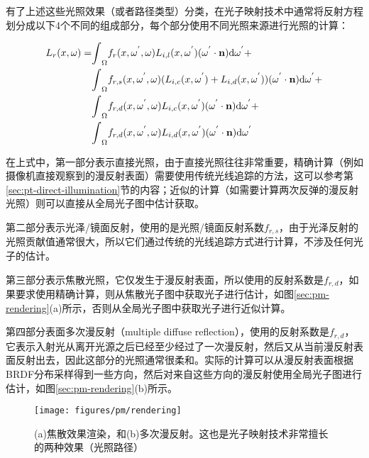 有了上述这些光照效果（或者路径类型）分类，在光子映射技术中通常将反射方程划分成以下4个不同的组成部分，每个部分使用不同光照来源进行光照的计算：

\begin{equation}\label{e:pm-four-componenets-equation}
\begin{aligned}
	L_r(x,{\omega})=&{\rm \int}_\Omega f_r(x,{\omega}^{'},{\omega}) L_{i,l}(x,{\omega}^{'}) ({\omega}^{'}\cdot\mathbf{n}) {\rm d}{\omega}^{'}+ \\
	&{\rm \int}_\Omega f_{r,s}(x,{\omega}^{'},{\omega}) (L_{i,c}(x,{\omega}^{'})+L_{i,d}(x,{\omega}^{'})) ({\omega}^{'}\cdot\mathbf{n}) {\rm d}{\omega}^{'}+ \\
	&{\rm \int}_\Omega f_{r,d}(x,{\omega}^{'},{\omega}) L_{i,c}(x,{\omega}^{'}) ({\omega}^{'}\cdot\mathbf{n}) {\rm d}{\omega}^{'}+ \\
	&{\rm \int}_\Omega f_{r,d}(x,{\omega}^{'},{\omega}) L_{i,d}(x,{\omega}^{'}) ({\omega}^{'}\cdot\mathbf{n}) {\rm d}{\omega}^{'}
\end{aligned}
\end{equation}

在上式中，第一部分表示直接光照，由于直接光照往往非常重要，精确计算（例如摄像机直接观察到的漫反射表面）需要使用传统光线追踪的方法，这可以参考第\ref{sec:pt-direct-illumination}节的内容；近似的计算（如需要计算两次反弹的漫反射光照）则可以直接从全局光子图中估计获取。

第二部分表示光泽/镜面反射，使用的是光照/镜面反射系数$f_{r,s}$，由于光泽反射的光照贡献值通常很大，所以它们通过传统的光线追踪方式进行计算，不涉及任何光子的估计。

第三部分表示焦散光照，它仅发生于漫反射表面，所以使用的反射系数是$f_{r,d}$，如果要求使用精确计算，则从焦散光子图中获取光子进行估计，如图\ref{sec:pm-rendering}(a)所示，否则从全局光子图中获取光子进行近似计算。

第四部分表面多次漫反射（multiple diffuse reflection），使用的反射系数是$f_{r,d}$，它表示入射光从离开光源之后已经至少经过了一次漫反射，然后又从当前漫反射表面反射出去，因此这部分的光照通常很柔和。实际的计算可以从漫反射表面根据BRDF分布采样得到一些方向，然后对来自这些方向的漫反射使用全局光子图进行估计，如图\ref{sec:pm-rendering}(b)所示。

\begin{figure}
	\sidecaption
	\texttt{[image: figures/pm/rendering]}
	\caption{(a)焦散效果渲染，和(b)多次漫反射。这也是光子映射技术非常擅长的两种效果（光照路径）}
	\label{f:pm-rendering}
\end{figure}








